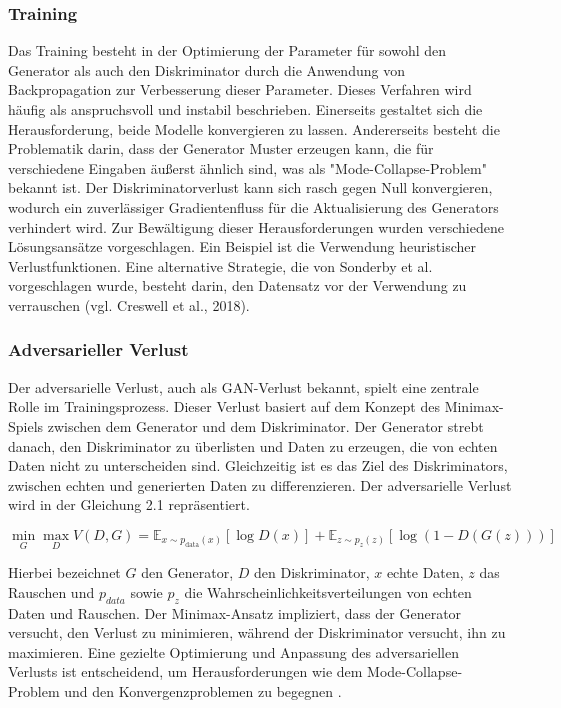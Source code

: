 \subsubsection*{Training}
Das Training besteht in der Optimierung der Parameter für sowohl den Generator als auch den Diskriminator durch die Anwendung von Backpropagation zur Verbesserung dieser Parameter. Dieses Verfahren wird häufig als anspruchsvoll und instabil beschrieben. Einerseits gestaltet sich die Herausforderung, beide Modelle konvergieren zu lassen. Andererseits besteht die Problematik darin, dass der Generator Muster erzeugen kann, die für verschiedene Eingaben äußerst ähnlich sind, was als "Mode-Collapse-Problem" bekannt ist. Der Diskriminatorverlust kann sich rasch gegen Null konvergieren, wodurch ein zuverlässiger Gradientenfluss für die Aktualisierung des Generators verhindert wird.
Zur Bewältigung dieser Herausforderungen wurden verschiedene Lösungsansätze vorgeschlagen. Ein Beispiel ist die Verwendung heuristischer Verlustfunktionen. Eine alternative Strategie, die von Sonderby et al. vorgeschlagen wurde, besteht darin, den Datensatz vor der Verwendung zu verrauschen (vgl. Creswell et al., 2018).

\subsubsection*{Adversarieller Verlust}
Der adversarielle Verlust, auch als GAN-Verlust bekannt, spielt eine zentrale Rolle im Trainingsprozess. Dieser Verlust basiert auf dem Konzept des Minimax-Spiels zwischen dem Generator und dem Diskriminator. Der Generator strebt danach, den Diskriminator zu überlisten und Daten zu erzeugen, die von echten Daten nicht zu unterscheiden sind. Gleichzeitig ist es das Ziel des Diskriminators, zwischen echten und generierten Daten zu differenzieren. Der adversarielle Verlust wird in der Gleichung 2.1 repräsentiert.

\begin{equation}
    \min_G \max_D V(D, G) = \mathbb{E}_{x\sim p_{\text{data}}(x)}[\log D(x)] + \mathbb{E}_{z\sim p_z(z)}[\log(1 - D(G(z)))]
\end{equation}

Hierbei bezeichnet $G$ den Generator, $D$ den Diskriminator, $x$ echte Daten, $z$ das Rauschen und $p_{data}$ sowie $p_z$ die Wahrscheinlichkeitsverteilungen von echten Daten und Rauschen. Der Minimax-Ansatz impliziert, dass der Generator versucht, den Verlust zu minimieren, während der Diskriminator versucht, ihn zu maximieren. Eine gezielte Optimierung und Anpassung des adversariellen Verlusts ist entscheidend, um Herausforderungen wie dem Mode-Collapse-Problem und den Konvergenzproblemen zu begegnen \cite{Hong.2020}.

